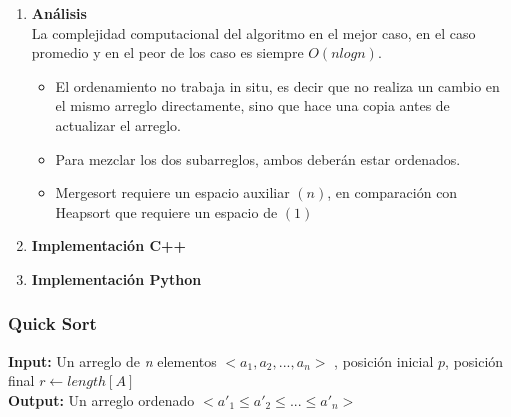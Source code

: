 \documentclass{article}
\begin{document}
                    \begin{enumerate}
                        \item \textbf{An\'{a}lisis}\\
                            La complejidad computacional del algoritmo en el mejor caso, en el caso promedio y en el peor de los caso es siempre $O(n log n)$. 
                            \begin{itemize}
            		            \item El ordenamiento no trabaja in situ, es decir que no realiza un cambio en el mismo arreglo directamente, sino que hace una copia antes de actualizar el arreglo.
            		            \item Para mezclar los dos subarreglos, ambos deberán estar ordenados.
            		            \item Mergesort requiere un espacio auxiliar $(n)$, en comparación con Heapsort que requiere un espacio de $(1)$
            		        \end{itemize}
                            \item \textbf{Implementaci\'{o}n C++}
                    
                            
                            
                            \item \textbf{Implementaci\'{o}n Python}\\
                    
                            
                        
                    \end{enumerate}
		         
		        \subsubsection{Quick Sort}
		        
    		        \begin{flushleft}
    		            \textbf{Input:} Un arreglo de \textit{n} elementos $<a_1,a_2,...,a_n>$ , posici\'{o}n inicial $p$, posici\'{o}n final $r \leftarrow length[A]$  \\
        		        
        		        \textbf{Output:} Un arreglo ordenado $<a'_1 \leq a'_2 \leq ... \leq a'_n>$
    		        \end{flushleft}
    		        
\end{document}
